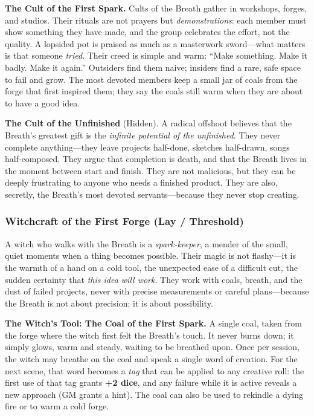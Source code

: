 \textbf{The Cult of the First Spark.} Cults of the Breath gather in workshops, forges, and studios. Their rituals are not prayers but \emph{demonstrations}: each member must show something they have made, and the group celebrates the effort, not the quality. A lopsided pot is praised as much as a masterwork sword---what matters is that someone \emph{tried}. Their creed is simple and warm: ``Make something. Make it badly. Make it again.'' Outsiders find them naive; insiders find a rare, safe space to fail and grow. The most devoted members keep a small jar of coals from the forge that first inspired them; they say the coals still warm when they are about to have a good idea.

\textbf{The Cult of the Unfinished} (Hidden). A radical offshoot believes that the Breath's greatest gift is the \emph{infinite potential of the unfinished}. They never complete anything---they leave projects half-done, sketches half-drawn, songs half-composed. They argue that completion is death, and that the Breath lives in the moment between start and finish. They are not malicious, but they can be deeply frustrating to anyone who needs a finished product. They are also, secretly, the Breath's most devoted servants---because they never stop creating.

\subsubsection*{Witchcraft of the First Forge (Lay / Threshold)}
A witch who walks with the Breath is a \emph{spark-keeper}, a mender of the small, quiet moments when a thing becomes possible. Their magic is not flashy---it is the warmth of a hand on a cold tool, the unexpected ease of a difficult cut, the sudden certainty that \emph{this idea will work}. They work with coals, breath, and the dust of failed projects, never with precise measurements or careful plans---because the Breath is not about precision; it is about possibility.

\textbf{The Witch's Tool: The Coal of the First Spark.} A single coal, taken from the forge where the witch first felt the Breath's touch. It never burns down; it simply glows, warm and steady, waiting to be breathed upon. Once per session, the witch may breathe on the coal and speak a single word of creation. For the next scene, that word becomes a \emph{tag} that can be applied to any creative roll: the first use of that tag grants \textbf{+2 dice}, and any failure while it is active reveals a new approach (GM grants a hint). The coal can also be used to rekindle a dying fire or to warm a cold forge.

